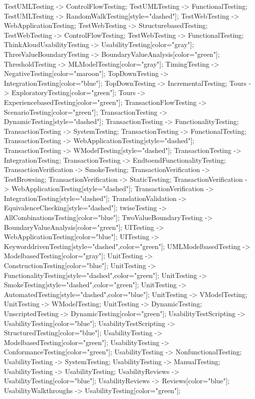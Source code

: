\documentclass{article}
\begin{document}
{TestUMLTesting -> ControlFlowTesting;
TestUMLTesting -> FunctionalTesting;
TestUMLTesting -> RandomWalkTesting[style="dashed"];
TestWebTesting -> WebApplicationTesting;
TestWebTesting -> StructurebasedTesting;
TestWebTesting -> ControlFlowTesting;
TestWebTesting -> FunctionalTesting;
ThinkAloudUsabilityTesting -> UsabilityTesting[color="gray"];
ThreeValueBoundaryTesting -> BoundaryValueAnalysis[color="green"];
ThresholdTesting -> MLModelTesting[color="gray"];
TimingTesting -> NegativeTesting[color="maroon"];
TopDownTesting -> IntegrationTesting[color="blue"];
TopDownTesting -> IncrementalTesting;
Tours -> ExploratoryTesting[color="green"];
Tours -> ExperiencebasedTesting[color="green"];
TransactionFlowTesting -> ScenarioTesting[color="green"];
TransactionTesting -> DynamicTesting[style="dashed"];
TransactionTesting -> FunctionalityTesting;
TransactionTesting -> SystemTesting;
TransactionTesting -> FunctionalTesting;
TransactionTesting -> WebApplicationTesting[style="dashed"];
TransactionTesting -> WModelTesting[style="dashed"];
TransactionTesting -> IntegrationTesting;
TransactionTesting -> EndtoendFunctionalityTesting;
TransactionVerification -> SmokeTesting;
TransactionVerification -> TestBrowsing;
TransactionVerification -> StaticTesting;
TransactionVerification -> WebApplicationTesting[style="dashed"];
TransactionVerification -> IntegrationTesting[style="dashed"];
TranslationValidation -> EquivalenceChecking[style="dashed"];
twiseTesting -> AllCombinationsTesting[color="blue"];
TwoValueBoundaryTesting -> BoundaryValueAnalysis[color="green"];
UITesting -> WebApplicationTesting[color="blue"];
UITesting -> KeyworddrivenTesting[style="dashed",color="green"];
UMLModelbasedTesting -> ModelbasedTesting[color="gray"];
UnitTesting -> ConstructionTesting[color="blue"];
UnitTesting -> FunctionalityTesting[style="dashed",color="green"];
UnitTesting -> SmokeTesting[style="dashed",color="green"];
UnitTesting -> AutomatedTesting[style="dashed",color="blue"];
UnitTesting -> VModelTesting;
UnitTesting -> WModelTesting;
UnitTesting -> DynamicTesting;
UnscriptedTesting -> DynamicTesting[color="green"];
UsabilityTestScripting -> UsabilityTesting[color="blue"];
UsabilityTestScripting -> StructuredTesting[color="blue"];
UsabilityTesting -> ModelbasedTesting[color="green"];
UsabilityTesting -> ConformanceTesting[color="green"];
UsabilityTesting -> NonfunctionalTesting;
UsabilityTesting -> SystemTesting;
UsabilityTesting -> ManualTesting;
UsabilityTesting -> UsabilityTesting;
UsabilityReviews -> UsabilityTesting[color="blue"];
UsabilityReviews -> Reviews[color="blue"];
UsabilityWalkthroughs -> UsabilityTesting[color="green"];
}
\end{document}
